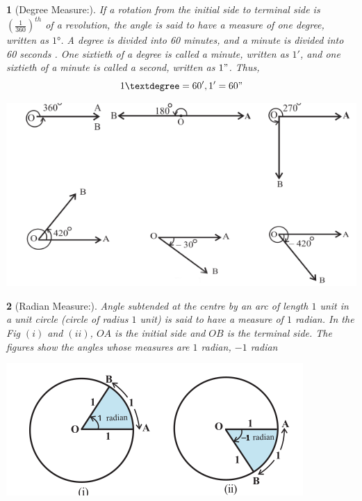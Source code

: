 \documentclass[12pt]{article}
\theoremstyle{colored}
\newtheorem*{defn}{}
\theoremstyle{subcolored}
\begin{document}
\begin{multicols}{2}
    \begin{defn}[Degree Measure:]
      If a rotation from the initial side to terminal side is $(\frac{1}{360})^{th}$ of  
a revolution, the angle is said to have a measure of one degree, written as $1°$. A degree is
divided into 60 minutes, and a minute is divided into 60 seconds . One sixtieth of a degree is
called a minute, written as $1'$, and one sixtieth of a minute is called a second, written as $1"$.
Thus,
$$1°=60' , 1'=60"$$
      
    \end{defn}
    \begin{center}
      \includegraphics[scale=0.45]{im3.png}
    \end{center}


    \begin{defn}[Radian Measure:]

      Angle subtended at the centre by an arc of length $1$ unit in a
unit circle (circle of radius $1$ unit) is said to have a measure of $1$ radian. In the Fig
$(i)$ and $(ii)$, $OA$ is the initial side and $OB$ is the terminal side. The figures show the
angles whose measures are $1$ radian, $-1$ radian
    \end{defn}
    \begin{center}
      \includegraphics[scale=0.45]{im4.png}
    \end{center}


\end{multicols}
\end{document}
